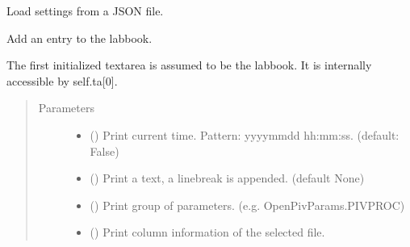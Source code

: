 \documentclass[letterpaper,10pt,english]{sphinxmanual}
\begin{document}
\begin{fulllineitems}
\begin{fulllineitems}
\label{\detokenize{openpivgui:openpivgui.OpenPivGui.OpenPivGui.load_settings}}
Load settings from a JSON file.

\end{fulllineitems}


\begin{fulllineitems}
\label{\detokenize{openpivgui:openpivgui.OpenPivGui.OpenPivGui.log}}
Add an entry to the lab\sphinxhyphen{}book.

The first initialized text\sphinxhyphen{}area is assumed to be the lab\sphinxhyphen{}book.
It is internally accessible by self.ta{[}0{]}.
\begin{quote}\begin{description}
\item[{Parameters}] \leavevmode\begin{itemize}
\item {} 
 () \textendash{} Print current time.
Pattern: yyyy\sphinxhyphen{}mm\sphinxhyphen{}dd hh:mm:ss.
(default: False)

\item {} 
 () \textendash{} Print a text, a linebreak is appended.
(default None)

\item {} 
 () \textendash{} Print group of parameters.
(e.g. OpenPivParams.PIVPROC)

\item {} 
 () \textendash{} Print column information of the selected file.


\end{itemize}
\end{description}
\end{quote}
\end{fulllineitems}
\end{fulllineitems}
\end{document}
